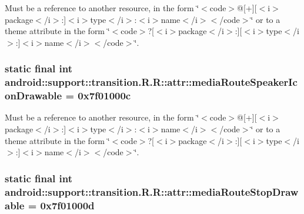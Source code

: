 Must be a reference to another resource, in the form \char`\"{}$<$code$>$@\mbox{[}+\mbox{]}\mbox{[}$<$i$>$package$<$/i$>$:\mbox{]}$<$i$>$type$<$/i$>$:$<$i$>$name$<$/i$>$$<$/code$>$\char`\"{} or to a theme attribute in the form \char`\"{}$<$code$>$?\mbox{[}$<$i$>$package$<$/i$>$:\mbox{]}\mbox{[}$<$i$>$type$<$/i$>$:\mbox{]}$<$i$>$name$<$/i$>$$<$/code$>$\char`\"{}. \hypertarget{classandroid_1_1support_1_1transition_1_1_r_1_1attr_55af0f56de433facb4598f7cd4d5e832}{
\subsubsection[{mediaRouteSpeakerIconDrawable}]{\setlength{\rightskip}{0pt plus 5cm}static final int android::support::transition.R.R::attr::mediaRouteSpeakerIconDrawable = 0x7f01000c}}
\label{classandroid_1_1support_1_1transition_1_1_r_1_1attr_55af0f56de433facb4598f7cd4d5e832}


Must be a reference to another resource, in the form \char`\"{}$<$code$>$@\mbox{[}+\mbox{]}\mbox{[}$<$i$>$package$<$/i$>$:\mbox{]}$<$i$>$type$<$/i$>$:$<$i$>$name$<$/i$>$$<$/code$>$\char`\"{} or to a theme attribute in the form \char`\"{}$<$code$>$?\mbox{[}$<$i$>$package$<$/i$>$:\mbox{]}\mbox{[}$<$i$>$type$<$/i$>$:\mbox{]}$<$i$>$name$<$/i$>$$<$/code$>$\char`\"{}. \hypertarget{classandroid_1_1support_1_1transition_1_1_r_1_1attr_a6019f725661c11293d7008fd2299ce8}{
\subsubsection[{mediaRouteStopDrawable}]{\setlength{\rightskip}{0pt plus 5cm}static final int android::support::transition.R.R::attr::mediaRouteStopDrawable = 0x7f01000d}}
\label{classandroid_1_1support_1_1transition_1_1_r_1_1attr_a6019f725661c11293d7008fd2299ce8}


